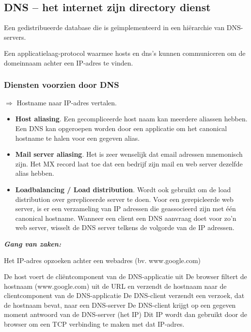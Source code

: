 \subsection{DNS – het internet zijn directory dienst}

\noindent Een gedistribueerde database die is geïmplementeerd in een hiërarchie van DNS-servers.

\noindent Een applicatielaag-protocol waarmee hosts en \acrshort{dns}’s kunnen communiceren om de domeinnaam achter een IP-adres te vinden.

\subsubsection{Diensten voorzien door DNS}

\noindent $\Rightarrow$ Hostname naar IP-adres vertalen.

\begin{itemize}
  \item \textbf{Host aliasing}. Een gecompliceerde host naam kan meerdere aliassen hebben. Een DNS kan opgeroepen worden door een applicatie om het canonical hostname te halen voor een gegeven alias.
\item \textbf{Mail server aliasing}. Het is zeer wenselijk dat email adressen mnemonisch zijn. Het MX record laat toe dat een bedrijf zijn mail en web server dezelfde alias hebben.
\item \textbf{Loadbalancing / Load distribution}. Wordt ook gebruikt om de load distribution over gerepliceerde server te doen. Voor een gerepicleerde web server, is er een verzameling van IP adressen die geassocieerd zijn met één canonical hostname. Wanneer een client een DNS aanvraag doet voor zo’n web server, wisselt de DNS server telkens de volgorde van de IP adressen.
\end{itemize}

\newpage

\noindent \textit{\textbf{Gang van zaken:}}

\noindent Het IP-adres opzoeken achter een webadres (bv. www.google.com)

\be
\itf De host voert de cliëntcomponent van de DNS-applicatie uit
\itf De browser filtert de hostnaam (www.google.com) uit de URL en verzendt de hostnaam naar de clientcomponent van de DNS-applicatie
\itf De DNS-client verzendt een verzoek, dat de hostnaam bevat, naar een DNS-server
\itf De DNS-client krijgt op een gegeven moment antwoord van de DNS-server (het IP)
\itf Dit IP wordt dan gebruikt door de browser om een TCP verbinding te maken met dat IP-adres.
\ee



